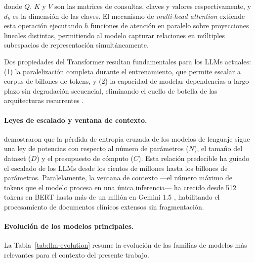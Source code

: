 \noindent donde $Q$, $K$ y $V$ son las matrices de consultas, claves y valores respectivamente, y $d_k$ es la dimensión de las claves. El mecanismo de \textit{multi-head attention} extiende esta operación ejecutando $h$ funciones de atención en paralelo sobre proyecciones lineales distintas, permitiendo al modelo capturar relaciones en múltiples subespacios de representación simultáneamente.

Dos propiedades del Transformer resultan fundamentales para los \ac{LLM}s actuales: (1) la paralelización completa durante el entrenamiento, que permite escalar a corpus de billones de tokens, y (2) la capacidad de modelar dependencias a largo plazo sin degradación secuencial, eliminando el cuello de botella de las arquitecturas recurrentes \parencite{vaswani2017attention}.

\paragraph{Leyes de escalado y ventana de contexto.}

\textcite{kaplan2020scaling} demostraron que la pérdida de entropía cruzada de los modelos de lenguaje sigue una ley de potencias con respecto al número de parámetros ($N$), el tamaño del dataset ($D$) y el presupuesto de cómputo ($C$). Esta relación predecible ha guiado el escalado de los \ac{LLM}s desde los cientos de millones hasta los billones de parámetros. Paralelamente, la ventana de contexto ---el número máximo de tokens que el modelo procesa en una única inferencia--- ha crecido desde 512 tokens en \ac{BERT} \parencite{devlin2019bert} hasta más de un millón en Gemini 1.5 \parencite{geminiteam2023gemini}, habilitando el procesamiento de documentos clínicos extensos sin fragmentación.

\paragraph{Evolución de los modelos principales.}

La Tabla~\ref{tab:llm-evolution} resume la evolución de las familias de modelos más relevantes para el contexto del presente trabajo.

